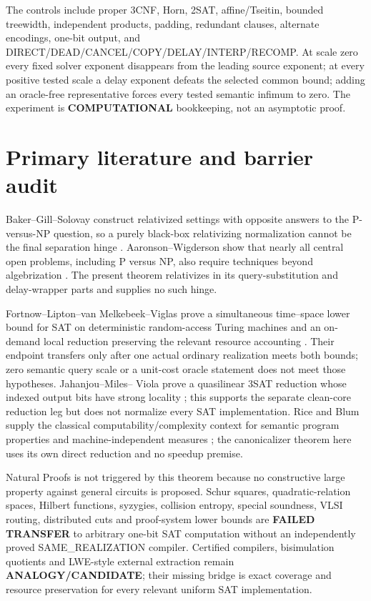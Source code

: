 \documentclass[11pt]{article}
\newcommand{\COMP}{\textbf{COMPUTATIONAL}}
\begin{document}
The controls include proper 3CNF, Horn, 2SAT, affine/Tseitin, bounded
treewidth, independent products, padding, redundant clauses, alternate
encodings, one-bit output, and DIRECT/DEAD/CANCEL/COPY/DELAY/INTERP/RECOMP.
At scale zero every fixed solver exponent disappears from the leading
source exponent; at every positive tested scale a delay exponent defeats the
selected common bound; adding an oracle-free representative forces every
tested semantic infimum to zero.  The experiment is \COMP{} bookkeeping,
not an asymptotic proof.

\section{Primary literature and barrier audit}

Baker--Gill--Solovay construct relativized settings with opposite answers to
the P-versus-NP question, so a purely black-box relativizing normalization
cannot be the final separation hinge \cite{bgs}.  Aaronson--Wigderson show
that nearly all central open problems, including P versus NP, also require
techniques beyond algebrization \cite{aw}.  The present theorem relativizes
in its query-substitution and delay-wrapper parts and supplies no such hinge.

Fortnow--Lipton--van Melkebeek--Viglas prove a simultaneous time--space lower
bound for SAT on deterministic random-access Turing machines and an on-demand
local reduction preserving the relevant resource accounting
\cite[Theorem~3.1]{flmv}.  Their endpoint transfers only after one actual
ordinary realization meets both bounds; zero semantic query scale or a
unit-cost oracle statement does not meet those hypotheses.  Jahanjou--Miles--
Viola prove a quasilinear 3SAT reduction whose indexed output bits have strong
locality \cite{jmv}; this supports the separate clean-core reduction leg but
does not normalize every SAT implementation.  Rice and Blum supply the
classical computability/complexity context for semantic program properties
and machine-independent measures \cite{rice,blum}; the canonicalizer theorem
here uses its own direct reduction and no speedup premise.

Natural Proofs is not triggered by this theorem because no constructive
large property against general circuits is proposed.  Schur squares,
quadratic-relation spaces, Hilbert functions, syzygies, collision entropy,
special soundness, VLSI routing, distributed cuts and proof-system lower
bounds are \textbf{FAILED TRANSFER} to arbitrary one-bit SAT computation
without an independently proved SAME\_REALIZATION compiler.  Certified
compilers, bisimulation quotients and LWE-style external extraction remain
\textbf{ANALOGY/CANDIDATE}; their missing bridge is exact coverage and
resource preservation for every relevant uniform SAT implementation.
\end{document}
